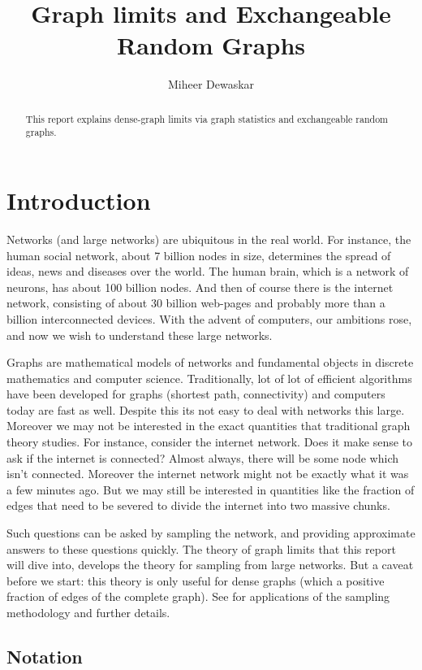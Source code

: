 \documentclass{article}
\title{Graph limits and Exchangeable Random Graphs}
\author{Miheer Dewaskar}
\begin{document}
\maketitle
\begin{abstract}
  This report explains dense-graph limits via graph statistics and exchangeable random graphs.
\end{abstract}

\section{Introduction}

Networks (and large networks) are ubiquitous in the real world. For instance, the human social network, about 7 billion nodes in size, determines the spread of ideas, news and diseases over the world. The human brain, which is a network of neurons, has about 100 billion nodes. And then of course there is the internet network, consisting of about 30 billion web-pages and probably more than a billion interconnected devices. With the advent of computers, our ambitions rose, and now we wish to understand these large networks. 

Graphs are mathematical models of networks and fundamental objects in discrete mathematics and computer science. Traditionally, lot of lot of efficient algorithms have been developed for graphs (shortest path, connectivity)  and computers today are fast as well. Despite this its not easy to deal with networks this large. Moreover we may not be interested in the exact quantities that traditional graph theory studies. For instance, consider the internet network. Does it make sense to ask if the internet is connected? Almost always, there will be some node which isn't connected. Moreover the internet network might not be exactly what it was a few minutes ago. But we may still be interested in quantities like the fraction of edges that need to be severed to divide the internet into two massive chunks. 

Such questions can be asked by sampling the network, and providing approximate answers to these questions quickly. The theory of graph limits that this report will dive into, develops the theory for sampling from large networks. But a caveat before we start: this theory is only useful for dense graphs (which a positive fraction of edges of the complete graph). See \cite{lovasz-book} for applications of the sampling methodology and further details.

\subsection{Notation}
\label{sec:notation}
\end{document}
